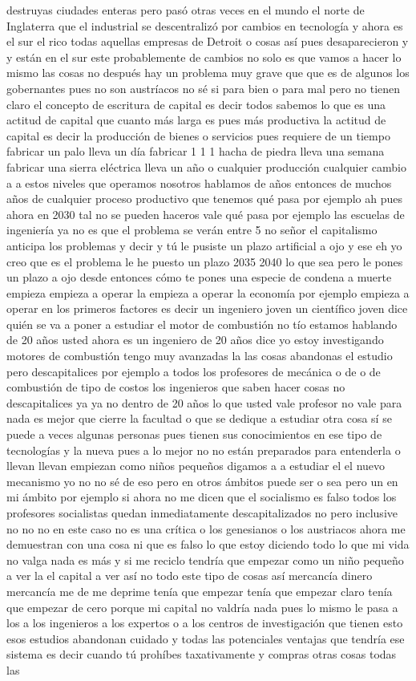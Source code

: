 destruyas ciudades enteras pero pasó otras veces en el mundo el norte de Inglaterra que el industrial se descentralizó por cambios en tecnología y ahora es el sur el rico todas aquellas empresas de Detroit o cosas así pues desaparecieron y y están en el sur este probablemente de cambios no solo es que vamos a hacer lo mismo las cosas no después hay un problema muy grave que que es de algunos los gobernantes pues no son austríacos no sé si para bien o para mal pero no tienen claro el concepto de escritura de capital es decir todos sabemos lo que es una actitud de capital que cuanto más larga es pues más productiva la actitud de capital es decir la producción de bienes o servicios pues requiere de un tiempo fabricar un palo lleva un día fabricar 1 1 1 hacha de piedra lleva una semana fabricar una sierra eléctrica lleva un año o cualquier producción cualquier cambio a a estos niveles que operamos nosotros hablamos de años entonces de muchos años de cualquier proceso productivo que tenemos qué pasa por ejemplo ah pues ahora en 2030 tal no se pueden haceros vale qué pasa por ejemplo las escuelas de ingeniería ya no es que el problema se verán entre 5 no señor el capitalismo anticipa los problemas y decir y tú le pusiste un plazo artificial a ojo y ese eh yo creo que es el problema le he puesto un plazo 2035 2040 lo que sea pero le pones un plazo a ojo desde entonces cómo te pones una especie de condena a muerte empieza empieza a operar la empieza a operar la economía por ejemplo empieza a operar en los primeros factores es decir un ingeniero joven un científico joven dice quién se va a poner a estudiar el motor de combustión no tío estamos hablando de 20 años usted ahora es un ingeniero de 20 años dice yo estoy investigando motores de combustión tengo muy avanzadas la las cosas abandonas el estudio pero descapitalices por ejemplo a todos los profesores de mecánica o de o de combustión de tipo de costos los ingenieros que saben hacer cosas no descapitalices ya ya no dentro de 20 años lo que usted vale profesor no vale para nada es mejor que cierre la facultad o que se dedique a estudiar otra cosa sí se puede a veces algunas personas pues tienen sus conocimientos en ese tipo de tecnologías y la nueva pues a lo mejor no no están preparados para entenderla o llevan llevan empiezan como niños pequeños digamos a a estudiar el el nuevo mecanismo yo no no sé de eso pero en otros ámbitos puede ser o sea pero un en mi ámbito por ejemplo si ahora no me dicen que el socialismo es falso todos los profesores socialistas quedan inmediatamente descapitalizados no pero inclusive no no no en este caso no es una crítica o los genesianos o los austriacos ahora me demuestran con una cosa ni que es falso lo que estoy diciendo todo lo que mi vida no valga nada es más y si me reciclo tendría que empezar como un niño pequeño a ver la el capital a ver así no todo este tipo de cosas así mercancía dinero mercancía me de me deprime tenía que empezar tenía que empezar claro tenía que empezar de cero porque mi capital no valdría nada pues lo mismo le pasa a los a los ingenieros a los expertos o a los centros de investigación que tienen esto esos estudios abandonan cuidado y todas las potenciales ventajas que tendría ese sistema es decir cuando tú prohíbes taxativamente y compras otras cosas todas las 